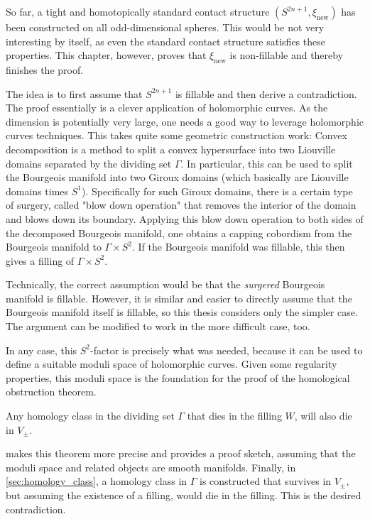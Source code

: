 So far, a tight and homotopically standard contact structure $(S^{2n+1}, \xi_\text{new})$ has been constructed on all odd-dimensional spheres.
This would be not very interesting by itself, as even the standard contact structure satisfies these properties.
This chapter, however, proves that $\xi_\text{new}$ is non-fillable and thereby finishes the proof.

The idea is to first assume that $S^{2n+1}$ is fillable and then derive a contradiction.
The proof essentially is a clever application of holomorphic curves.
As the dimension is potentially very large, one needs a good way to leverage holomorphic curves techniques.
This takes quite some geometric construction work: 
Convex decomposition is a method to split a convex hypersurface into two Liouville domains separated by the dividing set $\Gamma$.
In particular, this can be used to split the Bourgeois manifold into two Giroux domains (which basically are Liouville domains times $S^1$).
Specifically for such Giroux domains, there is a certain type of surgery, called "blow down operation" that removes the
interior of the domain and blows down its boundary.
Applying this blow down operation to both sides of the decomposed Bourgeois manifold, one obtains a
capping cobordism from the Bourgeois manifold to $\Gamma \times S^2$. 
If the Bourgeois manifold was fillable, this then gives a filling of $\Gamma \times S^2$.

Technically, the correct assumption would be that the \textit{surgered} Bourgeois manifold is fillable. 
However, it is similar and easier to directly assume that the Bourgeois manifold itself is fillable, 
so this thesis considers only the simpler case.
The argument can be modified to work in the more difficult case, too.

In any case, this $S^2$-factor is precisely what was needed, 
because it can be used to define a suitable moduli space of holomorphic curves. 
Given some regularity properties, this moduli space is the foundation for the proof of the homological obstruction theorem.
\begin{theorem}
    Any homology class in the dividing set $\Gamma$ that dies in the filling $W$, will also die in $V_\pm$.
\end{theorem}
 makes this theorem more precise and provides a proof sketch, assuming that the moduli space and
related objects are smooth manifolds.
Finally, in \cref{sec:homology_class}, a homology class in $\Gamma$ is constructed that survives in $V_\pm$, but assuming
the existence of a filling, would die in the filling. This is the desired contradiction. 